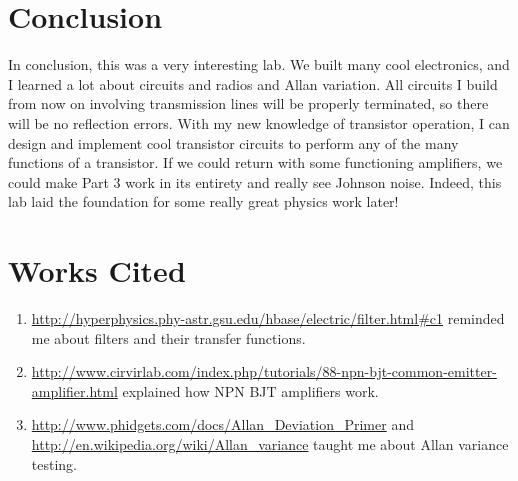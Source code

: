 \documentclass[11pt]{article}
\begin{document}
\section{Conclusion}
In conclusion, this was a very interesting lab. We built many cool electronics, and I learned a lot about circuits and radios and Allan variation.
All circuits I build from now on involving transmission lines will be properly terminated, so there will be no reflection errors. With my new 
knowledge of transistor operation, I can design and implement cool transistor circuits to perform any of the many functions of a transistor.
If we could return with some functioning amplifiers, we could make Part 3 work in its entirety and really see Johnson noise. Indeed, this lab
laid the foundation for some really great physics work later!
\pagebreak
\section{Works Cited}
\begin{enumerate}
\item\url{http://hyperphysics.phy-astr.gsu.edu/hbase/electric/filter.html#c1} reminded me about filters and their transfer functions.
\item\url{http://www.cirvirlab.com/index.php/tutorials/88-npn-bjt-common-emitter-amplifier.html} explained how NPN BJT amplifiers work. 
\item\url{http://www.phidgets.com/docs/Allan_Deviation_Primer} and \url{http://en.wikipedia.org/wiki/Allan_variance} taught me about Allan variance testing.
\end{enumerate}
\end{document}
